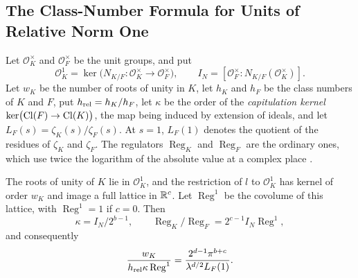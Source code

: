 \subsection{The Class-Number Formula for Units of Relative Norm One}

Let $\mathcal O_K^\times$ and $\mathcal O_F^\times$ be the unit groups,
and put
\[
 \mathcal O_K^1=\ker\bigl(N_{K/F}\colon\mathcal O_K^\times\to
 \mathcal O_F^\times\bigr),
 \qquad I_N=[\mathcal O_F^\times:N_{K/F}(\mathcal O_K^\times)].
\]
Let $w_K$ be the number of roots of unity in $K$, let $h_K$ and $h_F$ be
the class numbers of $K$ and $F$, put $h_{\rm rel}=h_K/h_F$, let $\kappa$
be the order of the \emph{capitulation kernel}
$\ker\bigl(\operatorname{Cl}(F)\to\operatorname{Cl}(K)\bigr)$, the map being induced by extension of
ideals, and let
$L_F(s)=\zeta_K(s)/\zeta_F(s)$. At $s=1$, $L_F(1)$ denotes the quotient
of the residues of $\zeta_K$ and $\zeta_F$. The regulators
$\operatorname{Reg}_K$ and $\operatorname{Reg}_F$ are the ordinary ones,
which use twice the logarithm of the absolute value at a complex place
\cite[Chapter~5]{MilneANT}.

\begin{proposition}\label{geo:mass}
The roots of unity of $K$ lie in $\mathcal O_K^1$, and the restriction of
$l$ to $\mathcal O_K^1$ has kernel of order $w_K$ and image a full
lattice in $\mathbb R^c$. Let $\operatorname{Reg}^1$ be the covolume of this
lattice, with $\operatorname{Reg}^1=1$ if $c=0$. Then
\[
 \kappa=I_N/2^{b-1},\qquad
 \operatorname{Reg}_K/\operatorname{Reg}_F=2^{c-1}I_N\operatorname{Reg}^1,
\]
and consequently
\begin{equation}\label{geo:mass-density}
 \frac{w_K}{h_{\rm rel}\kappa\operatorname{Reg}^1}
 =\frac{2^{d-1}\pi^{b+c}}{\lambda^{d/2}L_F(1)}.
\end{equation}
\end{proposition}

